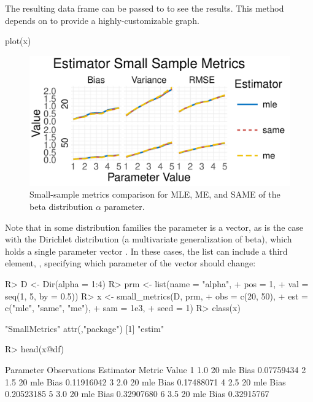 \documentclass[nojss]{jss}
\newcommand{\fct}[1]{\code{#1()}}
\begin{document}
The resulting data frame can be passed to \fct{plot} to see the results. This \fct{plot} method depends on  to provide a highly-customizable graph.

\begin{CodeChunk}
\begin{CodeInput}
plot(x)
\end{CodeInput}
\end{CodeChunk}

\begin{figure}[t!]
\centering
\includegraphics{estim_jss-vis_small_beta}
  \caption{\label{fig:vis-small-beta} Small-sample metrics comparison for MLE, ME, and SAME of the beta distribution $\alpha$ parameter.}
\end{figure}

Note that in some distribution families the parameter is a vector, as is the case with the Dirichlet distribution (a multivariate generalization of beta), which holds a single parameter vector . In these cases, the  list can include a third element, , specifying which parameter of the vector should change:

\begin{Schunk}
\begin{Sinput}
R> D <- Dir(alpha = 1:4)
R> prm <- list(name = "alpha",
+              pos = 1,
+              val = seq(1, 5, by = 0.5))
R> x <- small_metrics(D, prm,
+                     obs = c(20, 50),
+                     est = c("mle", "same", "me"),
+                     sam = 1e3,
+                     seed = 1)
R> class(x)
\end{Sinput}
\begin{Soutput}
[1] "SmallMetrics"
attr(,"package")
[1] "estim"
\end{Soutput}
\begin{Sinput}
R> head(x@df)
\end{Sinput}
\begin{Soutput}
  Parameter Observations Estimator Metric      Value
1       1.0           20       mle   Bias 0.07759434
2       1.5           20       mle   Bias 0.11916042
3       2.0           20       mle   Bias 0.17488071
4       2.5           20       mle   Bias 0.20523185
5       3.0           20       mle   Bias 0.32907680
6       3.5           20       mle   Bias 0.32915767
\end{Soutput}
\end{Schunk}
\end{document}
